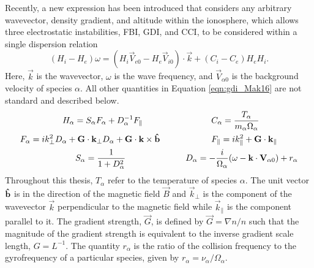 Recently, a new expression has been introduced that considers any arbitrary wavevector, density gradient, and altitude within the ionosphere, which allows three electrostatic instabilities, FBI, GDI, and CCI, to be considered within a single dispersion relation \citep{Makarevich2016a}
\begin{equation}
	\label{eqn:gdi_Mak16}
	(H_i-H_e)\omega = (H_i\vec{V}_{e0}-H_e\vec{V}_{i0})\cdot\vec{k}+(C_i-C_e)H_eH_i.
\end{equation}
Here, \(\vec{k}\) is the wavevector, \(\omega\) is the wave frequency, and \(\vec{V}_{\alpha 0}\) is the background velocity of species \(\alpha\).  All other quantities in Equation \ref{eqn:gdi_Mak16} are not standard and described below.
\begin{equation}
\begin{split}
	H_\alpha = S_\alpha F_\alpha + D_\alpha^{-1} F_\parallel \quad\quad\quad\quad&\quad\quad\quad\quad 
	C_\alpha = \frac{T_\alpha}{m_\alpha \Omega_\alpha} \\
	F_\alpha = i k_\perp^2 D_\alpha + \mathbf{G}\cdot\mathbf{k}_\perp D_\alpha + \mathbf{G}\cdot\mathbf{k}\times\mathbf{\hat{b}} \quad\quad&\quad\quad\quad\quad
	F_\parallel = i k_\parallel^2 + \mathbf{G}\cdot\mathbf{k}_\parallel \\
	S_\alpha = \frac{1}{1+D_\alpha^2} \quad\quad\quad\quad\quad\quad&\quad
	D_\alpha = -\frac{i}{\Omega_\alpha}(\omega-\mathbf{k}\cdot\mathbf{V}_{\alpha 0})+r_\alpha
\end{split}
\end{equation}
Throughout this thesis, \(T_\alpha\) refer to the temperature of species \(\alpha\).  The unit vector \(\mathbf{\hat{b}}\) is in the direction of the magnetic field \(\vec{B}\) and \(\vec{k}_\perp\) is the component of the wavevector \(\vec{k}\) perpendicular to the magnetic field while \(\vec{k}_\parallel\) is the component parallel to it.  The gradient strength, \(\vec{G}\), is defined by \(\vec{G} = \nabla n/n\) such that the magnitude of the gradient strength is equivalent to the inverse gradient scale length, \(G = L^{-1}\).  The quantity \(r_\alpha\) is the ratio of the collision frequency to the gyrofrequency of a particular species, given by \(r_\alpha = \nu_\alpha/\Omega_\alpha\).  

